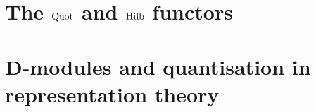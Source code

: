     \begin{appendices}
        \chapter{The \texorpdfstring{$\mathrm{Quot}$}{} and \texorpdfstring{$\mathrm{Hilb}$}{} functors}
            \begin{abstract}
            
            \end{abstract}
            
            \minitoc
            
            
            
            
            
            
            
        \chapter{D-modules and quantisation in representation theory}
            \begin{abstract}
            
            \end{abstract}
            
            \minitoc
            
            
            
            
            
    \end{appendices}
	
	\printbibliography

